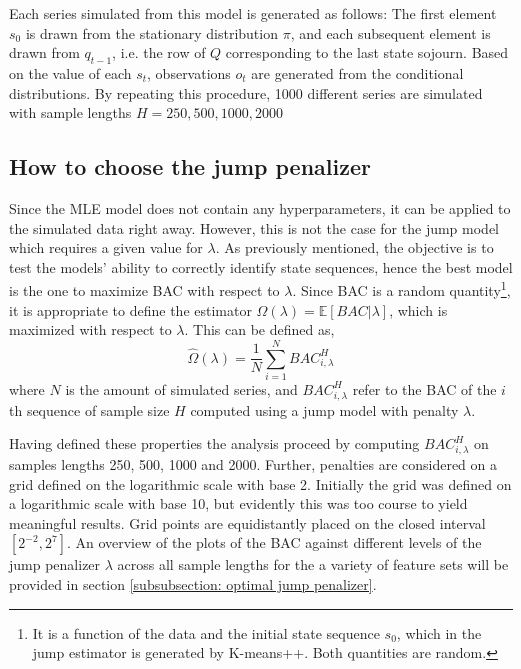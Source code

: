 Each series simulated from this model is generated as follows: The first element $s_0$ is drawn from the stationary distribution $\pi$, and each subsequent element is drawn from $q_{t-1}$, i.e. the row of $Q$ corresponding to the last state sojourn. Based on the value of each $s_t$, observations $o_t$ are generated from the conditional distributions. By repeating this procedure, 1000 different series are simulated with sample lengths $H = 250, 500, 1000, 2000$

\subsection{How to choose the jump penalizer}
\label{subsection: jump_penalizer}
Since the MLE model does not contain any hyperparameters, it can be applied to the simulated data right away. However, this is not the case for the jump model which requires a given value for $\lambda$. As previously mentioned, the objective is to test the models' ability to correctly identify state sequences, hence the best model is the one to maximize BAC with respect to $\lambda$. Since BAC is a random quantity\footnote
{It is a function of the data and the initial state sequence $s_0$, which in the jump estimator is generated by K-means++. Both quantities are random.},
it is appropriate to define the estimator $\Omega(\lambda)= \mathbb{E}[BAC|\lambda]$, which is maximized with respect to $\lambda$. This can be defined as, 
\begin{equation}
    \hat\Omega(\lambda) = \frac{1}{N} \sum_{i=1}^N BAC_{i, \lambda}^H
\end{equation}
where $N$ is the amount of simulated series, and $BAC_{i, \lambda}^H$ refer to the BAC of the $i$th sequence of sample size $H$ computed using a jump model with penalty $\lambda$.

Having defined these properties the analysis proceed by computing $BAC_{i, \lambda}^H$ on samples lengths 250, 500, 1000 and 2000. Further, penalties are considered on a grid defined on the logarithmic scale with base 2. Initially the grid was defined on a logarithmic scale with base 10, but evidently this was too course to yield meaningful results. Grid points are equidistantly placed on the closed interval $[2^{-2}, 2^{7}]$. An overview of the plots of the BAC against different levels of the jump penalizer $\lambda$ across all sample lengths for the a variety of feature sets will be provided in section \ref{subsubsection: optimal jump penalizer}.  


